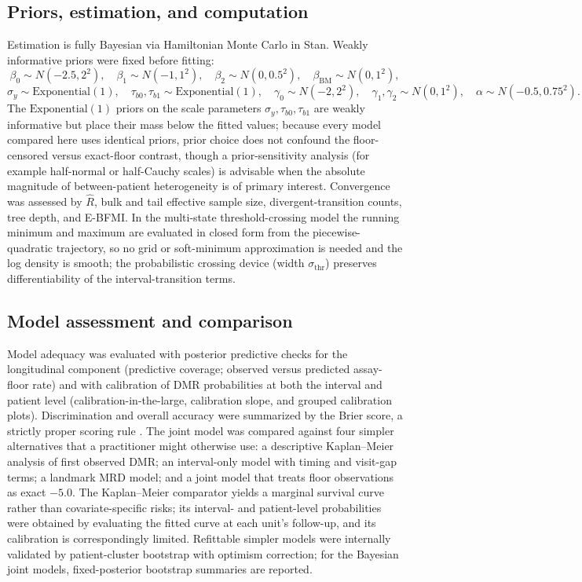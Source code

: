 \documentclass[11pt]{article}
\begin{document}
\subsection{Priors, estimation, and computation}
\label{sec:computation}

Estimation is fully Bayesian via Hamiltonian Monte Carlo in Stan.
Weakly informative priors were fixed before fitting:
\[
\beta_0\sim N(-2.5,2^2),\quad
\beta_1\sim N(-1,1^2),\quad
\beta_2\sim N(0,0.5^2),\quad
\beta_{\mathrm{BM}}\sim N(0,1^2),
\]
\[
\sigma_y\sim \mathrm{Exponential}(1),\quad
\tau_{b0},\tau_{b1}\sim \mathrm{Exponential}(1),\quad
\gamma_0\sim N(-2,2^2),\quad
\gamma_1,\gamma_2\sim N(0,1^2),\quad
\alpha\sim N(-0.5,0.75^2).
\]
The $\mathrm{Exponential}(1)$ priors on the scale parameters
$\sigma_y,\tau_{b0},\tau_{b1}$ are weakly informative but place their mass
below the fitted values; because every model compared here uses identical
priors, prior choice does not confound the floor-censored versus exact-floor
contrast, though a prior-sensitivity analysis (for example half-normal or
half-Cauchy scales) is advisable when the absolute magnitude of
between-patient heterogeneity is of primary interest.
Convergence was assessed by $\widehat{R}$, bulk and tail effective sample
size, divergent-transition counts, tree depth, and E-BFMI. In the multi-state threshold-crossing model the running minimum and maximum
are evaluated in closed form from the piecewise-quadratic trajectory, so no
grid or soft-minimum approximation is needed and the log density is smooth;
the probabilistic crossing device (width $\sigma_{\mathrm{thr}}$) preserves
differentiability of the interval-transition terms.

\subsection{Model assessment and comparison}
\label{sec:assessment}

Model adequacy was evaluated with posterior predictive checks for the
longitudinal component (predictive coverage; observed versus predicted
assay-floor rate) and with calibration of DMR probabilities at both the
interval and patient level (calibration-in-the-large, calibration slope,
and grouped calibration plots). Discrimination and overall accuracy were
summarized by the Brier score, a strictly proper scoring rule
\cite{GneitingRaftery2007ProperScoring}. The joint model was compared against four
simpler alternatives that a practitioner might otherwise use: a
descriptive Kaplan--Meier analysis of first observed DMR; an interval-only
model with timing and visit-gap terms; a landmark MRD model; and a joint
model that treats floor observations as exact $-5.0$. The Kaplan--Meier
comparator yields a marginal survival curve rather than covariate-specific
risks; its interval- and patient-level probabilities were obtained by
evaluating the fitted curve at each unit's follow-up, and its calibration is
correspondingly limited. Refittable simpler models were internally validated
by patient-cluster bootstrap with optimism correction; for the Bayesian joint
models, fixed-posterior bootstrap summaries are reported.
\end{document}

